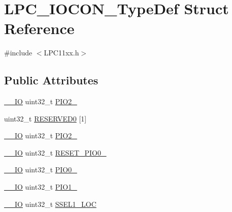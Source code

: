 \hypertarget{struct_l_p_c___i_o_c_o_n___type_def}{}\section{L\+P\+C\+\_\+\+I\+O\+C\+O\+N\+\_\+\+Type\+Def Struct Reference}
\label{struct_l_p_c___i_o_c_o_n___type_def}


{\ttfamily \#include $<$L\+P\+C11xx.\+h$>$}

\subsection*{Public Attributes}
\begin{DoxyCompactItemize}
\item 
\hyperlink{group___c_m_s_i_s__core__definitions_gaec43007d9998a0a0e01faede4133d6be}{\+\_\+\+\_\+\+IO} uint32\+\_\+t \hyperlink{group___l_p_c11xx___definitions_gaaaca8c6a8f0ee9eadc44aefbcde5999d}{P\+I\+O2\+\_}
\item 
uint32\+\_\+t \hyperlink{group___l_p_c11xx___definitions_gae0c9ad1b3c2f523a2ae17423b3e14f39}{R\+E\+S\+E\+R\+V\+E\+D0} \mbox{[}1\mbox{]}
\item 
\hyperlink{group___c_m_s_i_s__core__definitions_gaec43007d9998a0a0e01faede4133d6be}{\+\_\+\+\_\+\+IO} uint32\+\_\+t \hyperlink{group___l_p_c11xx___definitions_ga527d194efec901713ea175d5d735601c}{P\+I\+O2\+\_}
\item 
\hyperlink{group___c_m_s_i_s__core__definitions_gaec43007d9998a0a0e01faede4133d6be}{\+\_\+\+\_\+\+IO} uint32\+\_\+t \hyperlink{group___l_p_c11xx___definitions_gab69af896ceb6c10b8f9de41aa033da88}{R\+E\+S\+E\+T\+\_\+\+P\+I\+O0\+\_}
\item 
\hyperlink{group___c_m_s_i_s__core__definitions_gaec43007d9998a0a0e01faede4133d6be}{\+\_\+\+\_\+\+IO} uint32\+\_\+t \hyperlink{group___l_p_c11xx___definitions_ga1be433c8d0d4b04d48d7435990640b82}{P\+I\+O0\+\_}
\item 
\hyperlink{group___c_m_s_i_s__core__definitions_gaec43007d9998a0a0e01faede4133d6be}{\+\_\+\+\_\+\+IO} uint32\+\_\+t \hyperlink{group___l_p_c11xx___definitions_ga7b21ecfdd70f25fde6090d50447fba94}{P\+I\+O1\+\_}
\item 
\hyperlink{group___c_m_s_i_s__core__definitions_gaec43007d9998a0a0e01faede4133d6be}{\+\_\+\+\_\+\+IO} uint32\+\_\+t \hyperlink{group___l_p_c11xx___definitions_gade4b6c37c371658c818344930384b993}{S\+S\+E\+L1\+\_\+\+L\+OC}
\item 

\end{DoxyCompactItemize}
